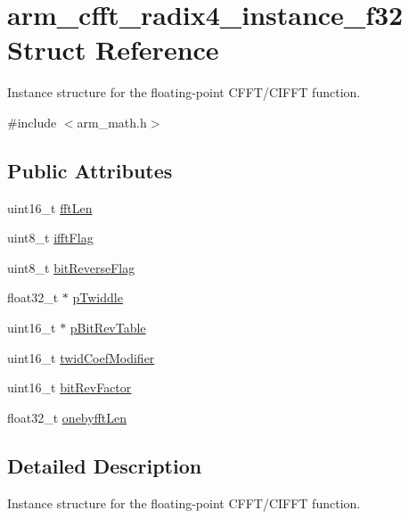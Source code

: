 \hypertarget{structarm__cfft__radix4__instance__f32}{\section{arm\-\_\-cfft\-\_\-radix4\-\_\-instance\-\_\-f32 Struct Reference}
\label{structarm__cfft__radix4__instance__f32}
}


Instance structure for the floating-\/point C\-F\-F\-T/\-C\-I\-F\-F\-T function.  




{\ttfamily \#include $<$arm\-\_\-math.\-h$>$}

\subsection*{Public Attributes}
\begin{DoxyCompactItemize}
\item 
uint16\-\_\-t \hyperlink{structarm__cfft__radix4__instance__f32_a7e6a6d290ce158ce9a15a45e364b021a}{fft\-Len}
\item 
uint8\-\_\-t \hyperlink{structarm__cfft__radix4__instance__f32_a25d1da64dd6487c291f04d226f9acc66}{ifft\-Flag}
\item 
uint8\-\_\-t \hyperlink{structarm__cfft__radix4__instance__f32_ac10927a1620195a88649ce63dab66120}{bit\-Reverse\-Flag}
\item 
float32\-\_\-t $\ast$ \hyperlink{structarm__cfft__radix4__instance__f32_a14860c7544911702ca1fa0bf78204ef3}{p\-Twiddle}
\item 
uint16\-\_\-t $\ast$ \hyperlink{structarm__cfft__radix4__instance__f32_a8da0d2ca69749fde8cbb95caeac6fe6a}{p\-Bit\-Rev\-Table}
\item 
uint16\-\_\-t \hyperlink{structarm__cfft__radix4__instance__f32_abe31ea2157dfa233e389cdfd3b9993ee}{twid\-Coef\-Modifier}
\item 
uint16\-\_\-t \hyperlink{structarm__cfft__radix4__instance__f32_acc8cb18a8b901b8321ab9d86491e41a3}{bit\-Rev\-Factor}
\item 
float32\-\_\-t \hyperlink{structarm__cfft__radix4__instance__f32_ab9eed39e40b8d7c16381fbccf84467cd}{onebyfft\-Len}
\end{DoxyCompactItemize}


\subsection{Detailed Description}
Instance structure for the floating-\/point C\-F\-F\-T/\-C\-I\-F\-F\-T function. 

